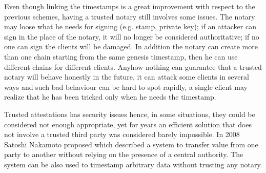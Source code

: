 Even though linking the timestamps is a great improvement with respect to the previous schemes, having a trusted notary still involves some issues. The notary may loose what he needs for signing (e.g. stamp, private key); if an attacker can sign in the place of the notary, it will no longer be considered authoritative; if no one can sign the clients will be damaged. In addition the notary can create more than one chain starting from the same genesis timestamp, then he can use different chains for different clients. 
Anyhow nothing can guarantee that a trusted notary will behave honestly in the future, it can attack some clients in several ways and such bad behaviour can be hard to spot rapidly, a single client may realize that he has been tricked only when he needs the timestamp.

Trusted attestations has security issues hence, in some situations, they could be considered not enough appropriate, yet for years an efficient solution that does not involve a trusted third party was considered barely impossible. 
In 2008 Satoshi Nakamoto proposed \cite{Nakamoto_bitcoin:a} which described a system to transfer value from one party to another without relying on the presence of a central authority. The system can be also used to timestamp arbitrary data without trusting any notary.